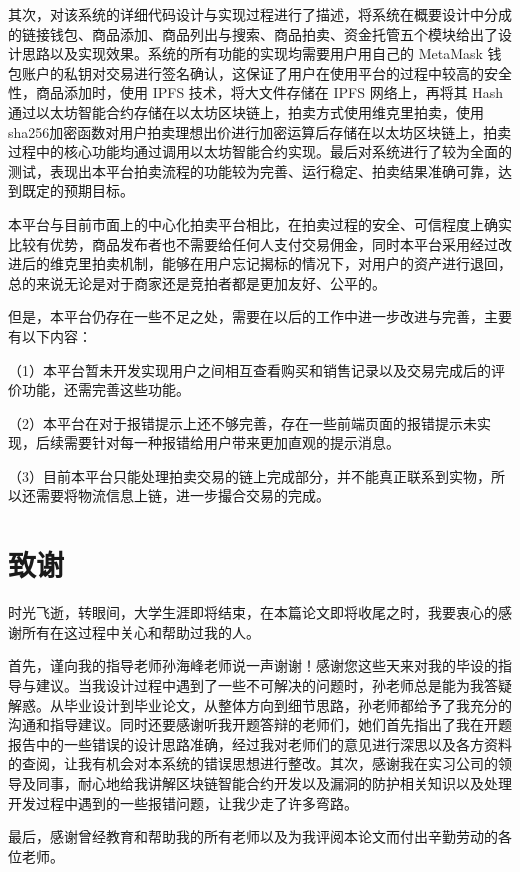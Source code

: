 \documentclass[
  10
]{article}
\begin{document}
其次，对该系统的详细代码设计与实现过程进行了描述，将系统在概要设计中分成的链接钱包、商品添加、商品列出与搜索、商品拍卖、资金托管五个模块给出了设计思路以及实现效果。系统的所有功能的实现均需要用户用自己的
MetaMask
钱包账户的私钥对交易进行签名确认，这保证了用户在使用平台的过程中较高的安全性，商品添加时，使用
IPFS 技术，将大文件存储在 IPFS 网络上，再将其 Hash
通过以太坊智能合约存储在以太坊区块链上，拍卖方式使用维克里拍卖，使用
sha256加密函数对用户拍卖理想出价进行加密运算后存储在以太坊区块链上，拍卖过程中的核心功能均通过调用以太坊智能合约实现。最后对系统进行了较为全面的测试，表现出本平台拍卖流程的功能较为完善、运行稳定、拍卖结果准确可靠，达到既定的预期目标。

本平台与目前市面上的中心化拍卖平台相比，在拍卖过程的安全、可信程度上确实比较有优势，商品发布者也不需要给任何人支付交易佣金，同时本平台采用经过改进后的维克里拍卖机制，能够在用户忘记揭标的情况下，对用户的资产进行退回，总的来说无论是对于商家还是竞拍者都是更加友好、公平的。

但是，本平台仍存在一些不足之处，需要在以后的工作中进一步改进与完善，主要有以下内容：

（1）本平台暂未开发实现用户之间相互查看购买和销售记录以及交易完成后的评价功能，还需完善这些功能。

（2）本平台在对于报错提示上还不够完善，存在一些前端页面的报错提示未实现，后续需要针对每一种报错给用户带来更加直观的提示消息。

（3）目前本平台只能处理拍卖交易的链上完成部分，并不能真正联系到实物，所以还需要将物流信息上链，进一步撮合交易的完成。

\section{致谢}\label{ux81f4ux8c22}

时光飞逝，转眼间，大学生涯即将结束，在本篇论文即将收尾之时，我要衷心的感谢所有在这过程中关心和帮助过我的人。

首先，谨向我的指导老师孙海峰老师说一声谢谢！感谢您这些天来对我的毕设的指导与建议。当我设计过程中遇到了一些不可解决的问题时，孙老师总是能为我答疑解惑。从毕业设计到毕业论文，从整体方向到细节思路，孙老师都给予了我充分的沟通和指导建议。同时还要感谢听我开题答辩的老师们，她们首先指出了我在开题报告中的一些错误的设计思路准确，经过我对老师们的意见进行深思以及各方资料的查阅，让我有机会对本系统的错误思想进行整改。其次，感谢我在实习公司的领导及同事，耐心地给我讲解区块链智能合约开发以及漏洞的防护相关知识以及处理开发过程中遇到的一些报错问题，让我少走了许多弯路。

最后，感谢曾经教育和帮助我的所有老师以及为我评阅本论文而付出辛勤劳动的各位老师。
\end{document}
